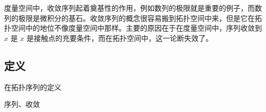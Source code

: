 

度量空间中，收敛序列起着奠基性的作用，例如数列的极限就是重要的例子，而数列的极限是微积分的基石。收敛序列的概念很容易搬到拓扑空间中来，但是它在拓扑空间中的地位不像度量空间中那样。主要的原因在于在度量空间中，序列收敛到 $x$ 是 $x$ 是接触点的充要条件，而在拓扑空间中，这一论断失效了。

\subsection{定义}
在拓扑序列的定义
\begin{definition}{序列、收敛}

\end{definition}




